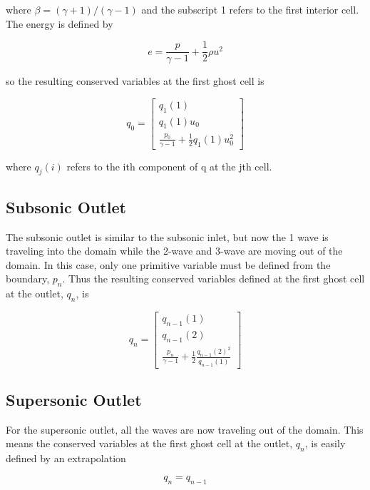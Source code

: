 \documentclass[11pt]{article}%
\numberwithin{equation}{section}
\begin{document}
where $\beta = (\gamma + 1) / (\gamma  - 1)$ and the subscript 1 refers to the first interior cell. The energy is defined by 

\begin{equation}
e = \frac{p}{\gamma - 1} + \frac{1}{2} \rho u^2
\end{equation}

so the resulting conserved variables at the first ghost cell is 

\begin{equation}
q_0 =  \left[ \begin{array}{c} q_1(1) \\ q_1(1) u_0 \\ \frac{p_0}{\gamma - 1} + \frac{1}{2} q_1(1) u_0^2 \end{array} \right]
\end{equation}

where $q_j(i)$ refers to the ith component of q at the jth cell.

\subsection{Subsonic Outlet}
The subsonic outlet is similar to the subsonic inlet, but now the 1 wave is traveling into the domain while the 2-wave and 3-wave are moving out of the domain. In this case, only one primitive variable must be defined from the boundary, $p_n$. Thus the resulting conserved variables defined at the first ghost cell at the outlet, $q_n$, is

\begin{equation}
q_n =  \left[ \begin{array}{c} q_{n-1}(1) \\ q_{n-1}(2) \\ \frac{p_n}{\gamma - 1} + \frac{1}{2}\frac{q_{n-1}(2)^2}{q_{n-1}(1)} \end{array} \right]
\end{equation}

\subsection{Supersonic Outlet}
For the supersonic outlet, all the waves are now traveling out of the domain. This means the conserved variables at the first ghost cell at the outlet, $q_n$, is easily defined by an extrapolation 

\begin{equation}
q_n  =  q_{n-1}
\end{equation}
\end{document}
